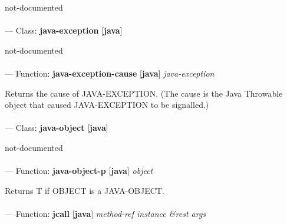 \begin{adjustwidth}{5em}{5em}
not-documented
\end{adjustwidth}

\paragraph{}
\label{JAVA:JAVA-EXCEPTION}
--- Class: \textbf{java-exception} [\textbf{java}] \textit{}

\begin{adjustwidth}{5em}{5em}
not-documented
\end{adjustwidth}

\paragraph{}
\label{JAVA:JAVA-EXCEPTION-CAUSE}
--- Function: \textbf{java-exception-cause} [\textbf{java}] \textit{java-exception}

\begin{adjustwidth}{5em}{5em}
Returns the cause of JAVA-EXCEPTION. (The cause is the Java Throwable
  object that caused JAVA-EXCEPTION to be signalled.)
\end{adjustwidth}

\paragraph{}
\label{JAVA:JAVA-OBJECT}
--- Class: \textbf{java-object} [\textbf{java}] \textit{}

\begin{adjustwidth}{5em}{5em}
not-documented
\end{adjustwidth}

\paragraph{}
\label{JAVA:JAVA-OBJECT-P}
--- Function: \textbf{java-object-p} [\textbf{java}] \textit{object}

\begin{adjustwidth}{5em}{5em}
Returns T if OBJECT is a JAVA-OBJECT.
\end{adjustwidth}

\paragraph{}
\label{JAVA:JCALL}
--- Function: \textbf{jcall} [\textbf{java}] \textit{method-ref instance \&rest args}

